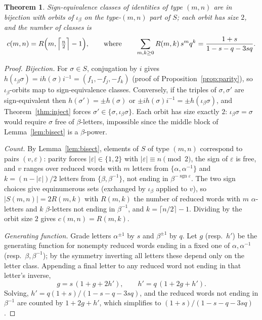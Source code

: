 \documentclass[11pt]{article}
\newtheorem{theorem}{Theorem}[section]
\theoremstyle{definition}
\theoremstyle{remark}
\newcommand{\ib}{\iota_\beta}
\begin{document}
\begin{theorem}\label{thm:census}
Sign-equivalence classes of identities of type $(m,n)$ are in bijection with orbits of $\ib$ on the type-$(m,n)$ part of $S$; each orbit has size $2$, and the number of classes is
\[
c(m,n)=R\Bigl(m,\Bigl\lceil\tfrac n2\Bigr\rceil-1\Bigr),
\qquad\text{where}\qquad
\sum_{m,k\ge0}R(m,k)\,s^mq^k=\frac{1+s}{1-s-q-3sq}.
\]
\end{theorem}

\begin{proof}
\emph{Bijection.} For $\sigma\in S$, conjugation by $i$ gives $h(\ib\sigma)=ih(\sigma)i^{-1}=(f_1,-f_j,-f_k)$ (proof of Proposition~\ref{prop:parity}), so $\ib$-orbits map to sign-equivalence classes. Conversely, if the triples of $\sigma,\sigma'$ are sign-equivalent then $h(\sigma')=\pm h(\sigma)$ or $\pm ih(\sigma)i^{-1}=\pm h(\ib\sigma)$, and Theorem~\ref{thm:inject} forces $\sigma'\in\{\sigma,\ib\sigma\}$. Each orbit has size exactly $2$: $\ib\sigma=\sigma$ would require $\sigma$ free of $\beta$-letters, impossible since the middle block of Lemma~\ref{lem:bisect} is a $\beta$-power.

\emph{Count.} By Lemma~\ref{lem:bisect}, elements of $S$ of type $(m,n)$ correspond to pairs $(v,\varepsilon)$: parity forces $|\varepsilon|\in\{1,2\}$ with $|\varepsilon|\equiv n\pmod 2$, the sign of $\varepsilon$ is free, and $v$ ranges over reduced words with $m$ letters from $\{\alpha,\alpha^{-1}\}$ and $k=(n-|\varepsilon|)/2$ letters from $\{\beta,\beta^{-1}\}$, not ending in $\beta^{-\operatorname{sgn}\varepsilon}$. The two sign choices give equinumerous sets (exchanged by $\ib$ applied to $v$), so $|S(m,n)|=2R(m,k)$ with $R(m,k)$ the number of reduced words with $m$ $\alpha$-letters and $k$ $\beta$-letters not ending in $\beta^{-1}$, and $k=\lceil n/2\rceil-1$. Dividing by the orbit size $2$ gives $c(m,n)=R(m,k)$.

\emph{Generating function.} Grade letters $\alpha^{\pm1}$ by $s$ and $\beta^{\pm1}$ by $q$. Let $g$ (resp.\ $h'$) be the generating function for nonempty reduced words ending in a fixed one of $\alpha,\alpha^{-1}$ (resp.\ $\beta,\beta^{-1}$); by the symmetry inverting all letters these depend only on the letter class. Appending a final letter to any reduced word not ending in that letter's inverse,
\[
g=s\,(1+g+2h'),\qquad h'=q\,(1+2g+h').
\]
Solving, $h'=q(1+s)/(1-s-q-3sq)$, and the reduced words not ending in $\beta^{-1}$ are counted by $1+2g+h'$, which simplifies to $(1+s)/(1-s-q-3sq)$.
\end{proof}
\end{document}
